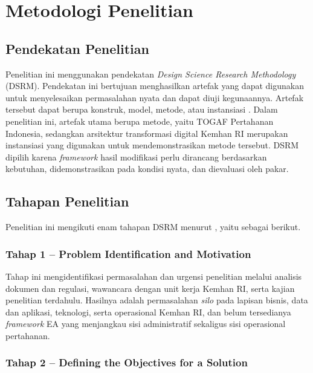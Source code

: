 \section{Metodologi Penelitian}
\label{sec:I.7}

\subsection{Pendekatan Penelitian}
\label{sec:I.7.1}

Penelitian ini menggunakan pendekatan \textit{Design Science Research Methodology} (DSRM). Pendekatan ini bertujuan menghasilkan artefak yang dapat digunakan untuk menyelesaikan permasalahan nyata dan dapat diuji kegunaannya. Artefak tersebut dapat berupa konstruk, model, metode, atau instansiasi \cite{Hevner2004}. Dalam penelitian ini, artefak utama berupa metode, yaitu TOGAF Pertahanan Indonesia, sedangkan arsitektur transformasi digital Kemhan RI merupakan instansiasi yang digunakan untuk mendemonstrasikan metode tersebut. DSRM dipilih karena \textit{framework} hasil modifikasi perlu dirancang berdasarkan kebutuhan, didemonstrasikan pada kondisi nyata, dan dievaluasi oleh pakar.

\subsection{Tahapan Penelitian}
\label{sec:I.7.2}

Penelitian ini mengikuti enam tahapan DSRM menurut \textcite{Peffers2007}, yaitu sebagai berikut.

\subsubsection{Tahap 1 – Problem Identification and Motivation}
\label{sec:I.7.2.1}

Tahap ini mengidentifikasi permasalahan dan urgensi penelitian melalui analisis dokumen dan regulasi, wawancara dengan unit kerja Kemhan RI, serta kajian penelitian terdahulu. Hasilnya adalah permasalahan \textit{silo} pada lapisan bisnis, data dan aplikasi, teknologi, serta operasional Kemhan RI, dan belum tersedianya \textit{framework} EA yang menjangkau sisi administratif sekaligus sisi operasional pertahanan.

\subsubsection{Tahap 2 – Defining the Objectives for a Solution}
\label{sec:I.7.2.2}

